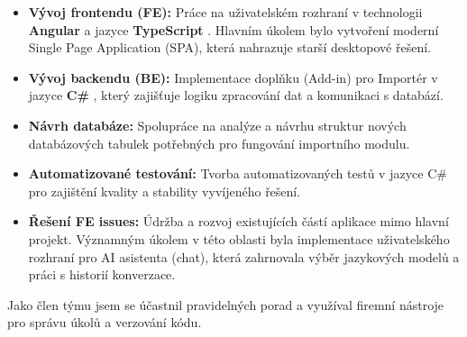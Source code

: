 \begin{itemize}
    \item \textbf{Vývoj frontendu (FE):} Práce na uživatelském rozhraní v technologii \textbf{Angular} \cite{angular_docs} a jazyce \textbf{TypeScript} \cite{typescript_docs}. Hlavním úkolem bylo vytvoření moderní Single Page Application (SPA), která nahrazuje starší desktopové řešení.
    \item \textbf{Vývoj backendu (BE):} Implementace doplňku (Add-in) pro Importér v jazyce \textbf{C\#} \cite{csharp_docs}, který zajišťuje logiku zpracování dat a komunikaci s databází.
    \item \textbf{Návrh databáze:} Spolupráce na analýze a návrhu struktur nových databázových tabulek potřebných pro fungování importního modulu.
    \item \textbf{Automatizované testování:} Tvorba automatizovaných testů v jazyce C\# pro zajištění kvality a stability vyvíjeného řešení.
    \item \textbf{Řešení FE issues:} Údržba a rozvoj existujících částí aplikace mimo hlavní projekt. Významným úkolem v této oblasti byla implementace uživatelského rozhraní pro AI asistenta (chat), která zahrnovala výběr jazykových modelů a práci s historií konverzace.
\end{itemize}

Jako člen týmu jsem se účastnil pravidelných porad a využíval firemní nástroje pro správu úkolů a verzování kódu.